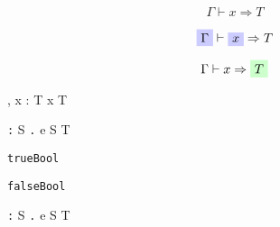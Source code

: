 \documentclass{beamer}
\newcommand{\lamann}[3]{\lambda {#1} \texttt{:} {#2} \texttt{.} \; {#3}}
\newcommand{\true}[0]{\texttt{true}}
\newcommand{\false}[0]{\texttt{false}}
\newcommand{\Bool}[0]{\texttt{Bool}}
\newcommand{\bluebox}[1]{\tikz[baseline] \node[fill=blue!20,rectangle,anchor=text]{#1}; }
\newcommand{\greenbox}[1]{\tikz[baseline] \node[fill=green!20,rectangle,anchor=text]{#1}; }
\begin{document}
\begin{frame}


  $$
  \Gamma \vdash x \Rightarrow T
  $$

\end{frame}

\begin{frame}


  \[
  \bluebox{$\Gamma$} \vdash \bluebox{$x$} \Rightarrow T
  \]

\end{frame}

\begin{frame}


  \[
  \Gamma \vdash x \Rightarrow \greenbox{$T$}
  \]

\end{frame}

\begin{frame}


  \infrule[T-var]
    {}
    {\Gamma , \; x : T \vdash x \Rightarrow T}

    {\Gamma \vdash \lamann{x}{S}{e} \;\; \Rightarrow \;\; S \rightarrow T}

  \infrule[T-true]
    {}
    {\Gamma \vdash \true \Rightarrow \Bool}

  \infrule[T-false]
    {}
    {\Gamma \vdash \false \Rightarrow \Bool}

\end{frame}

\begin{frame}


    {\Gamma \vdash \lamann{x}{S}{e} \;\; \Rightarrow \;\; S \rightarrow T}

\end{frame}
\end{document}

